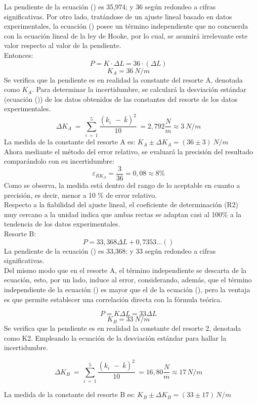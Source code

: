 \documentclass[../main.tex]{subfiles}
\begin{document}
La pendiente de la ecuación () es 35,974; y 36 según redondeo a cifras significativas. 
Por otro lado, tratándose de un ajuste lineal basado en datos experimentales, la ecuación () 
posee un término independiente que no concuerda con la ecuación lineal de la ley de
Hooke, por lo cual, se asumirá irrelevante este valor respecto al valor de la pendiente.\\
Entonces:
\[P = K \cdot \Delta L = 36 \cdot (\Delta L) \]
\[K_A=36\ N/m\]
Se verifica que la pendiente es en realidad la constante del resorte A, denotada como 
$K_A$.
Para determinar la incertidumbre, se calculará la desviación estándar (ecuación ()) de los
datos obtenidos de las constantes del resorte de los datos experimentales.
\[\Delta K_A\ =\ \sum_{i\ =\ 1}^{5}\frac{{(k_{i\ }\ -\ \bar{k})}^2}{10}\ =2,792\frac{N}{m}\approx3\ N/m\]
La medida de la constante del resorte A es: $K_A \pm \Delta K_A=(36\pm 3)\ N/m$\\
Ahora mediante el método del error relativo, se evaluará la precisión del resultado comparándolo con su incertidumbre:
\[\varepsilon_{RK_A} = \frac{3}{36} = 0,08 \approx 8\%\]
Como se observa, la medida está dentro del rango de lo aceptable en cuanto a precisión, 
es decir, menor a 10 \% de error relativo.\\
Respecto a la fiabilidad del ajuste lineal, el coeficiente de determinación (R2) muy 
cercano a la unidad indica que ambas rectas se adaptan casi al 100\% a la tendencia
de los datos experimentales.\\
Resorte B:
\[P=33,368 \Delta L+0,7353…()\]
La pendiente de la ecuación () es 33,368; y 33 según redondeo a cifras significativas. \\
Del mismo modo que en el resorte A, el término independiente se descarta de la 
ecuación, esto, por un lado, induce al error, considerando, además, que el término
independiente de la ecuación () es mayor que el de la ecuación (),
pero la ventaja es que permite establecer una correlación directa con la fórmula teórica.

\[P=K \Delta L=33 \Delta L\]
\[K_B=33\ N/m\]
Se verifica que la pendiente es en realidad la constante del resorte 2, denotada como K2.
Empleando la ecuación de la desviación estándar para hallar la incertidumbre.

\[\Delta K_B\ =\ \sum_{i\ =\ 1}^{5}\frac{{(k_{i\ }\ -\ \bar{k})}^2}{10}\ =16,80\frac{N}{m}\approx 17 \, N/m\]

La medida de la constante del resorte B es: $K_B \pm \Delta K_B=(33 \pm 17) \, N/m$ \\
\end{document}
